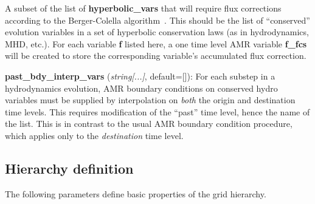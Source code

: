 \documentclass[aps,amssymb,unsortedaddress,nofootinbib]{revtex4}
\def\lsep{\itemsep 0.05in}
\begin{document}
\begin{list}{}{\lsep}
      A subset of the list of {\bf hyperbolic\_vars} that will require flux
      corrections according to the Berger-Colella algorithm~\cite{berger-colella}.
      This should be the list of ``conserved'' evolution variables in a set
      of hyperbolic conservation laws (as in hydrodynamics, MHD, etc.).  For 
      each variable {\bf f} listed here,
      a one time level AMR variable {\bf f\_fcs} will be created to store the
      corresponding variable's accumulated flux correction.  
\item {\bf past\_bdy\_interp\_vars} ({\em string[...]}, default=[]):
      For each substep in a hydrodynamics evolution, AMR boundary conditions
      on conserved hydro variables
      must be supplied by interpolation on {\em both} the origin and destination 
      time levels.  This requires modification of the ``past'' time level, hence
      the name of the list.  This is in contrast to the usual AMR boundary
      condition procedure, which applies only to the {\em destination} time level.
       
\end{list}


\subsection{Hierarchy definition}

The following parameters define basic properties of the 
grid hierarchy.
\end{document}
